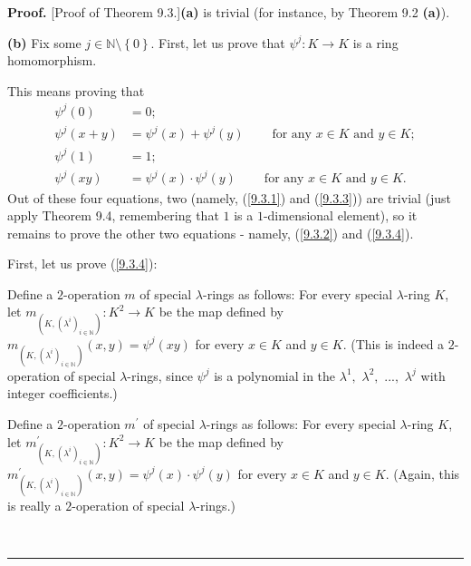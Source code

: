 \documentclass[numbers=enddot,12pt,final,onecolumn,notitlepage]{scrartcl}%
\newenvironment{proof}[1][Proof]{\noindent\textbf{#1.} }{\ \rule{0.5em}{0.5em}}
\begin{document}
\begin{proof}
[Proof of Theorem 9.3.]\textbf{(a)} is trivial (for instance, by Theorem 9.2
\textbf{(a)}).

\textbf{(b)} Fix some $j\in\mathbb{N}\setminus\left\{  0\right\}  $. First,
let us prove that $\psi^{j}:K\rightarrow K$ is a ring homomorphism.

This means proving that%
\begin{align}
\psi^{j}\left(  0\right)   &  =0;\label{9.3.1}\\
\psi^{j}\left(  x+y\right)   &  =\psi^{j}\left(  x\right)  +\psi^{j}\left(
y\right)  \ \ \ \ \ \ \ \ \ \ \text{for any }x\in K\text{ and }y\in
K;\label{9.3.2}\\
\psi^{j}\left(  1\right)   &  =1;\label{9.3.3}\\
\psi^{j}\left(  xy\right)   &  =\psi^{j}\left(  x\right)  \cdot\psi^{j}\left(
y\right)  \ \ \ \ \ \ \ \ \ \ \text{for any }x\in K\text{ and }y\in K.
\label{9.3.4}%
\end{align}
Out of these four equations, two (namely, (\ref{9.3.1}) and (\ref{9.3.3})) are
trivial (just apply Theorem 9.4, remembering that $1$ is a $1$-dimensional
element), so it remains to prove the other two equations - namely,
(\ref{9.3.2}) and (\ref{9.3.4}).

First, let us prove (\ref{9.3.4}):

Define a $2$-operation $m$ of special $\lambda$-rings as follows: For every
special $\lambda$-ring $K$, let $m_{\left(  K,\left(  \lambda^{i}\right)
_{i\in\mathbb{N}}\right)  }:K^{2}\rightarrow K$ be the map defined by
$m_{\left(  K,\left(  \lambda^{i}\right)  _{i\in\mathbb{N}}\right)  }\left(
x,y\right)  =\psi^{j}\left(  xy\right)  $ for every $x\in K$ and $y\in K$.
(This is indeed a $2$-operation of special $\lambda$-rings, since $\psi^{j}$
is a polynomial in the $\lambda^{1},$ $\lambda^{2},$ $...,$ $\lambda^{j}$ with
integer coefficients.)

Define a $2$-operation $m^{\prime}$ of special $\lambda$-rings as follows: For
every special $\lambda$-ring $K$, let $m_{\left(  K,\left(  \lambda
^{i}\right)  _{i\in\mathbb{N}}\right)  }^{\prime}:K^{2}\rightarrow K$ be the
map defined by $m_{\left(  K,\left(  \lambda^{i}\right)  _{i\in\mathbb{N}%
}\right)  }^{\prime}\left(  x,y\right)  =\psi^{j}\left(  x\right)  \cdot
\psi^{j}\left(  y\right)  $ for every $x\in K$ and $y\in K$. (Again, this is
really a $2$-operation of special $\lambda$-rings.)


\end{proof}
\end{document}
